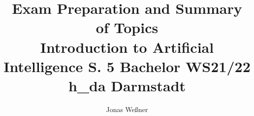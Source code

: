 \documentclass{article}
\begin{document}
\title{Exam Preparation and Summary of Topics\\Introduction to Artificial Intelligence S. 5 Bachelor WS21/22\\h\_da Darmstadt}
\author{Jonas Weßner}
\maketitle
\tableofcontents


\end{document}
